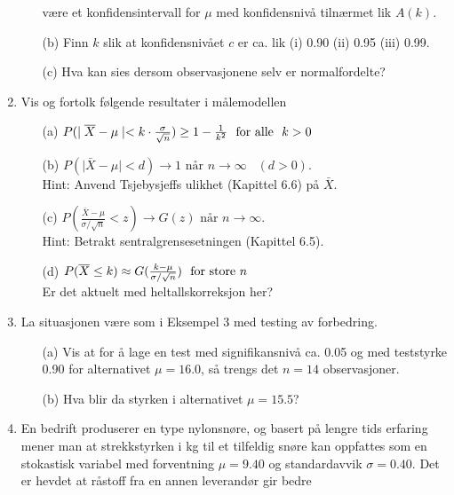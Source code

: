 \begin{enumerate}
\begin{itemize}
          være et konfidensintervall for $\mu$ med
          konfidensnivå tilnærmet lik $A(k)$.
  \item[(b)]  Finn $k$ slik at konfidensnivået $c$ er ca. lik
               (i) 0.90 (ii) 0.95 (iii) 0.99.
  \item[(c)]  Hva kan sies dersom observasjonene selv er
               normalfordelte?
 \end{itemize}
\item     Vis og fortolk følgende resultater i målemodellen
 \begin{itemize}
  \item[(a)]  $ P(\mid \bar X - \mu\mid < k\cdot
               {\sigma\over \sqrt n})\ge 1 - {1\over k^2}
               \mbox{\ \ for alle \ } k> 0 $
  \item[(b)]  $ P(\mid \bar X - \mu \mid < d) \rightarrow 1
              \mbox{\ \  når \ \ } n\rightarrow \infty \; \; \; (d>0).$\\
          Hint: Anvend Tsjebysjeffs ulikhet (Kapittel 6.6) på $\bar X$.
  \item[(c)]  $ P(\frac{\bar X - \mu}{\sigma /\sqrt{n}} < z) \rightarrow G(z)
              \mbox{\ \  når \ \ } n\rightarrow \infty $.\\
          Hint: Betrakt sentralgrensesetningen (Kapittel 6.5).
  \item[(d)]  $ P(\bar X \le k)\approx G({{k-\mu}\over \sigma/\sqrt n})
                 \mbox{\ \  for store $n$ }$\\
          Er det aktuelt med heltallskorreksjon her?
 \end{itemize}
\item     La situasjonen være som i Eksempel 3 med testing av forbedring.
 \begin{itemize}
  \item[(a)]  Vis at for å lage en test med
               signifikansnivå ca. 0.05 og med teststyrke
               0.90 for alternativet $\mu=16.0$, så trengs
               det $n=14$ observasjoner.
  \item[(b)]  Hva blir da styrken i alternativet $\mu=15.5$?
 \end{itemize}
\item     En bedrift produserer en type nylonsnøre, og basert
          på lengre tids erfaring mener man at strekkstyrken
          i kg til et tilfeldig snøre kan oppfattes som en
          stokastisk variabel med forventning $\mu=9.40$ og
          standardavvik $\sigma=0.40$. Det er hevdet at
          råstoff fra en annen leverandør gir bedre

\end{enumerate}
